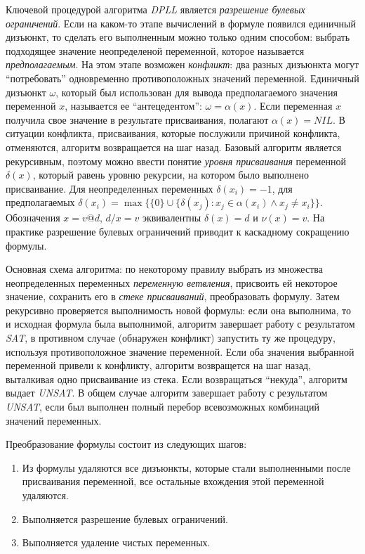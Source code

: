 Ключевой процедурой алгоритма \textit{DPLL} является \textit{разрешение булевых ограничений}. 
Если на каком-то этапе вычислений в формуле появился единичный дизъюнкт, то сделать его выполненным можно только одним способом: выбрать подходящее значение неопределеной переменной, которое называется \textit{предполагаемым}. На этом этапе возможен \textit{конфликт}: 
два разных дизъюнкта могут \enquote{потребовать} одновременно противоположных значений переменной. Единичный дизъюнкт $\omega$, 
который был использован для вывода предполагаемого значения переменной $x$, называется ее \enquote{антецедентом}: $\omega = \alpha(x)$. 
Если переменная $x$ получила свое значение в результате присваивания, полагают $\alpha(x) = NIL$.
В ситуации конфликта, присваивания, которые послужили причиной конфликта, отменяются, алгоритм возвращается на шаг назад. 
Базовый алгоритм является рекурсивным, поэтому можно ввести понятие \textit{уровня присваивания} переменной $\delta(x)$, который равень уровню рекурсии, на котором было выполнено присваивание. Для неопределенных переменных $\delta(x_i)=-1$, для предполагаемых 
$\delta(x_i) = \max \{ \{0\} \cup \{ \delta(x_j): x_j \in \alpha(x_i) \land x_j \ne x_i \} \}$. 
Обозначения $x = v @ d$, $d/x=v$ эквивалентны $\delta(x) = d$ и $\nu(x) = v$. 
На практике разрешение булевых ограничений приводит к каскадному сокращению формулы. 

Основная схема алгоритма: по некоторому правилу выбрать из множества неопределенных переменных \textit{переменную ветвления}, присвоить ей некоторое значение, сохранить его в \textit{стеке присваиваний}, преобразовать формулу. Затем рекурсивно проверяется выполнимость новой формулы: если она выполнима, то и исходная формула была выполнимой, алгоритм завершает работу с результатом \textit{SAT}, в противном случае (обнаружен конфликт) запустить ту же процедуру, используя противоположное значение переменной. 
Если оба значения выбранной переменной привели к конфликту, алгоритм возвращется на шаг назад, выталкивая одно присваивание из стека. Если возвращаться \enquote{некуда}, алгоритм выдает \textit{UNSAT}. 
В общем случае алгоритм завершает работу с результатом \textit{UNSAT}, если был выполнен полный перебор всевозможных комбинаций значений переменных.

Преобразование формулы состоит из следующих шагов:
\begin{enumerate}[leftmargin=1cm,topsep=0pt,itemsep=-1ex,partopsep=1ex,parsep=1ex,label=\arabic{*}.]
\item
Из формулы удаляются все дизъюнкты, которые стали выполненными после присваивания переменной, 
все остальные вхождения этой переменной удаляются.
\item Выполняется разрешение булевых ограничений.
\item Выполняется удаление чистых переменных.
\end{enumerate}

